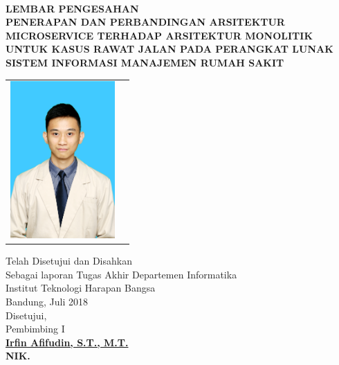 \renewcommand{\headrulewidth}{3pt} 
\thispagestyle{fancy}

\hspace{-2cm}\\[1cm]
\begin{center}
{\bfseries LEMBAR PENGESAHAN}\\[0.5 cm]
{\bfseries PENERAPAN DAN PERBANDINGAN ARSITEKTUR MICROSERVICE TERHADAP ARSITEKTUR MONOLITIK UNTUK KASUS RAWAT JALAN PADA PERANGKAT LUNAK SISTEM INFORMASI MANAJEMEN RUMAH SAKIT} \\[0.5 cm]
\end{center}

\vspace{0.5cm}

\begin{center}   
\begin{tabular}{ p{4.5cm}  p{5.5cm}}
 \includegraphics[width=4cm, height =6cm]{images/bieber.jpg} &
\vspace{-4cm}{Disusun oleh:\newline Nama: Edric Laksa Putra\newline NIM	: 1114065}

\end{tabular}
\end{center}
\doublespacing
{\center
\vspace{0.5cm}
Telah Disetujui dan Disahkan\\ Sebagai laporan Tugas Akhir Departemen Informatika\\
Institut Teknologi Harapan Bangsa\\[0.5cm]
Bandung,   Juli 2018\\
Disetujui,\\[0.5cm]}
{\center
Pembimbing I\\[2cm]
\bfseries 
{\underline {Irfin Afifudin, S.T., M.T.}\\
NIK. \\}}